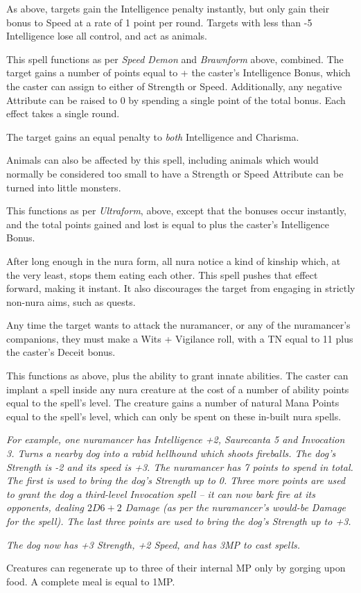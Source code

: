 \begin{multicols}{2}
As above, targets gain the Intelligence penalty instantly, but only gain their bonus to Speed at a rate of 1 point per round.  Targets with less than -5 Intelligence lose all control, and act as animals.

\spelllevel
{}
This spell functions as per {\it Speed Demon} and {\it Brawnform} above, combined.  The target gains a number of points equal to  + the caster's Intelligence Bonus, which the caster can assign to either of Strength or Speed.  Additionally, any negative Attribute can be raised to 0 by spending a single point of the total bonus.  Each effect takes a single round.

The target gains an equal penalty to {\it both} Intelligence and Charisma.

Animals can also be affected by this spell, including animals which would normally be considered too small to have a Strength or Speed Attribute can be turned into little monsters.

\spelllevel
{}
This functions as per {\it Ultraform}, above, except that the bonuses occur instantly, and the total points gained and lost is equal to  plus the caster's Intelligence Bonus.

After long enough in the nura form, all nura notice a kind of kinship which, at the very least, stops them eating each other.  This spell pushes that effect forward, making it instant.  It also discourages the target from engaging in strictly non-nura aims, such as quests.

Any time the target wants to attack the nuramancer, or any of the nuramancer's companions, they must make a Wits + Vigilance roll, with a TN equal to 11 plus the caster's Deceit bonus.

\spelllevel
{}

This functions as above, plus the ability to grant innate abilities.  The caster can implant a spell inside any nura creature at the cost of a number of ability points equal to the spell's level.  The creature gains a number of natural Mana Points equal to the spell's level, which can only be spent on these in-built nura spells.

\textit{For example, one nuramancer has Intelligence +2, Saurecanta 5 and Invocation 3.  Turns a nearby dog into a rabid hellhound which shoots fireballs.  The dog's Strength is -2 and its speed is +3.  The nuramancer has 7 points to spend in total.  The first is used to bring the dog's Strength up to 0.  Three more points are used to grant the dog a third-level Invocation spell -- it can now bark fire at its opponents, dealing $2D6+2$ Damage (as per the nuramancer's would-be Damage for the spell).  The last three points are used to bring the dog's Strength up to +3.}

\textit{The dog now has +3 Strength, +2 Speed, and has 3MP to cast spells.}

\noindent Creatures can regenerate up to three of their internal MP only by gorging upon food.  A complete meal is equal to 1MP.

\end{multicols}


